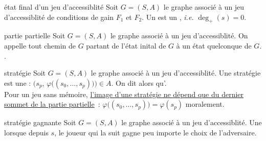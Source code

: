 \begin{adjustwidth}{-3cm}{-3cm}
\begin{definition}{4.6}{état final d'un jeu d'accessiblité}
    Soit $G = (S,A)$ le graphe associé à un jeu d'accessiblité de conditions de gain $F_1$ et $F_2$. Un  est un , \textit{i.e.} $\deg_+(s) = 0$.
\end{definition}

\begin{definition}{4.7}{partie partielle}
    Soit $G = (S,A)$ le graphe associé à un jeu d'accessiblité. On appelle  tout chemin de $G$ partant de l'état inital de $G$ à un état quelconque de $G$. .
\end{definition}

\begin{definition}{4.8}{stratégie}
    Soit $G = (S,A)$ le graphe associé à un jeu d'accessiblité. Une stratégie est une  : $\Big(s_p,\,  \varphi\big((s_0, \dots, s_p)\big)\Big) \in A$. On dit alors qu'. \\
    Pour un jeu sans mémoire, \underline{l'image d'une stratégie ne dépend que du dernier sommet de la partie partielle}~: $\varphi\big((s_0, \dots, s_p)\big) = \varphi(s_p)$ moralement.
\end{definition}

\begin{definition}{4.9}{stratégie gagnante}
    Soit $G = (S,A)$ le graphe associé à un jeu d'accessiblité. Une  lorsque depuis $s$, le joueur qui la suit gagne peu importe le choix de l'adversaire.
\end{definition}


\end{adjustwidth}

